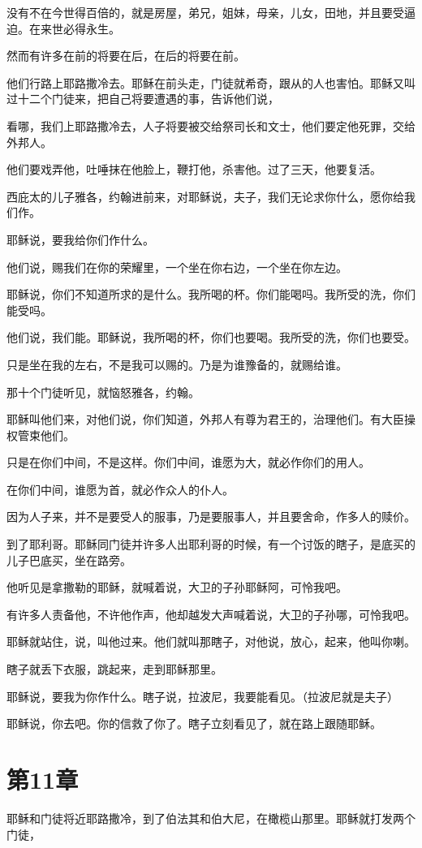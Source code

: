 \documentclass[12pt,oneside]{book}
\begin{document}
没有不在今世得百倍的，就是房屋，弟兄，姐妹，母亲，儿女，田地，并且要受逼迫。在来世必得永生。

然而有许多在前的将要在后，在后的将要在前。

他们行路上耶路撒冷去。耶稣在前头走，门徒就希奇，跟从的人也害怕。耶稣又叫过十二个门徒来，把自己将要遭遇的事，告诉他们说，

看哪，我们上耶路撒冷去，人子将要被交给祭司长和文士，他们要定他死罪，交给外邦人。

他们要戏弄他，吐唾抹在他脸上，鞭打他，杀害他。过了三天，他要复活。

西庇太的儿子雅各，约翰进前来，对耶稣说，夫子，我们无论求你什么，愿你给我们作。

耶稣说，要我给你们作什么。

他们说，赐我们在你的荣耀里，一个坐在你右边，一个坐在你左边。

耶稣说，你们不知道所求的是什么。我所喝的杯。你们能喝吗。我所受的洗，你们能受吗。

他们说，我们能。耶稣说，我所喝的杯，你们也要喝。我所受的洗，你们也要受。

只是坐在我的左右，不是我可以赐的。乃是为谁豫备的，就赐给谁。

那十个门徒听见，就恼怒雅各，约翰。

耶稣叫他们来，对他们说，你们知道，外邦人有尊为君王的，治理他们。有大臣操权管束他们。

只是在你们中间，不是这样。你们中间，谁愿为大，就必作你们的用人。

在你们中间，谁愿为首，就必作众人的仆人。

因为人子来，并不是要受人的服事，乃是要服事人，并且要舍命，作多人的赎价。

到了耶利哥。耶稣同门徒并许多人出耶利哥的时候，有一个讨饭的瞎子，是底买的儿子巴底买，坐在路旁。

他听见是拿撒勒的耶稣，就喊着说，大卫的子孙耶稣阿，可怜我吧。

有许多人责备他，不许他作声，他却越发大声喊着说，大卫的子孙哪，可怜我吧。

耶稣就站住，说，叫他过来。他们就叫那瞎子，对他说，放心，起来，他叫你喇。

瞎子就丢下衣服，跳起来，走到耶稣那里。

耶稣说，要我为你作什么。瞎子说，拉波尼，我要能看见。（拉波尼就是夫子）

耶稣说，你去吧。你的信救了你了。瞎子立刻看见了，就在路上跟随耶稣。

\chapter{第11章}
耶稣和门徒将近耶路撒冷，到了伯法其和伯大尼，在橄榄山那里。耶稣就打发两个门徒，
\end{document}

